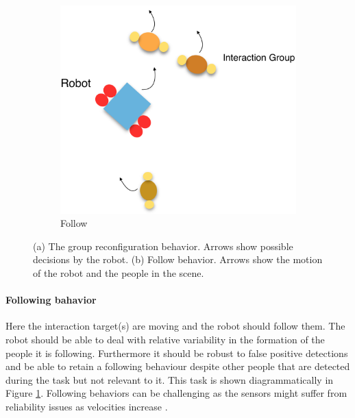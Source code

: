 \documentclass[letterpaper, 10 pt, conference]{ieeeconf}
\begin{document}
\begin{figure}[tbh]
\begin{subfigure}[b]{0.39\columnwidth}
    \includegraphics[scale = 0.15]{images/follow.png}
    \caption{Follow}
    \label{fig:follow}
  \end{subfigure} 
  \caption{(a) The group reconfiguration behavior. Arrows show possible decisions by the robot.  (b) Follow behavior. Arrows show the motion of the robot and the people in the scene.}

    \vspace{-2mm}

  \label{fig:behaviors}
  \end{figure}

\paragraph{Following bahavior} Here the interaction target(s) are moving and the robot should follow them. The robot should be able to deal with relative variability in the formation of the people it is following. Furthermore it should be robust to false positive detections and be able to retain a following behaviour despite other people that are detected during the task but not relevant to it. This task is shown diagrammatically in Figure \ref{fig:follow}. Following behaviors can be challenging as the sensors might suffer from reliability issues as velocities increase \cite{kobilarov2006people}.
\end{document}
